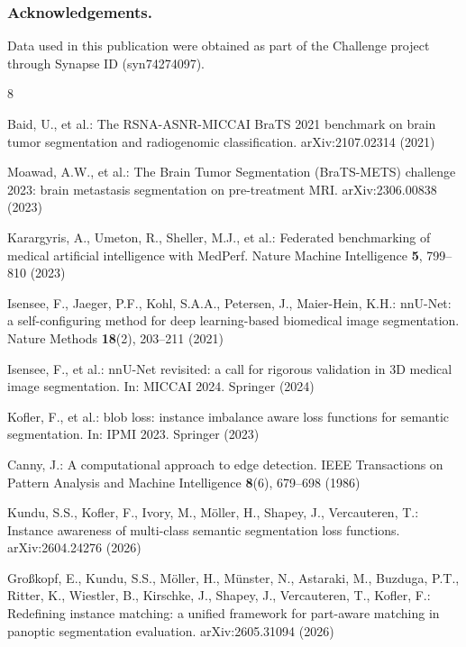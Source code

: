 \documentclass[runningheads]{llncs}
\begin{document}
\subsubsection{Acknowledgements.} Data used in this publication were obtained as part of the
Challenge project through Synapse ID (syn74274097).

\begin{thebibliography}{8}

Baid, U., et al.: The RSNA-ASNR-MICCAI BraTS 2021 benchmark on brain tumor segmentation and
radiogenomic classification. arXiv:2107.02314 (2021)

Moawad, A.W., et al.: The Brain Tumor Segmentation (BraTS-METS) challenge 2023: brain metastasis
segmentation on pre-treatment MRI. arXiv:2306.00838 (2023)

Karargyris, A., Umeton, R., Sheller, M.J., et al.: Federated benchmarking of medical artificial
intelligence with MedPerf. Nature Machine Intelligence \textbf{5}, 799--810 (2023)

Isensee, F., Jaeger, P.F., Kohl, S.A.A., Petersen, J., Maier-Hein, K.H.: nnU-Net: a
self-configuring method for deep learning-based biomedical image segmentation. Nature Methods
\textbf{18}(2), 203--211 (2021)

Isensee, F., et al.: nnU-Net revisited: a call for rigorous validation in 3D medical image
segmentation. In: MICCAI 2024. Springer (2024)

Kofler, F., et al.: blob loss: instance imbalance aware loss functions for semantic segmentation.
In: IPMI 2023. Springer (2023)

Canny, J.: A computational approach to edge detection. IEEE Transactions on Pattern Analysis and
Machine Intelligence \textbf{8}(6), 679--698 (1986)

Kundu, S.S., Kofler, F., Ivory, M., M\"oller, H., Shapey, J., Vercauteren, T.: Instance awareness
of multi-class semantic segmentation loss functions. arXiv:2604.24276 (2026)

Gro\ss{}kopf, E., Kundu, S.S., M\"oller, H., M\"unster, N., Astaraki, M., Buzduga, P.T., Ritter, K.,
Wiestler, B., Kirschke, J., Shapey, J., Vercauteren, T., Kofler, F.: Redefining instance matching:
a unified framework for part-aware matching in panoptic segmentation evaluation.
arXiv:2605.31094 (2026)


\end{thebibliography}
\end{document}
